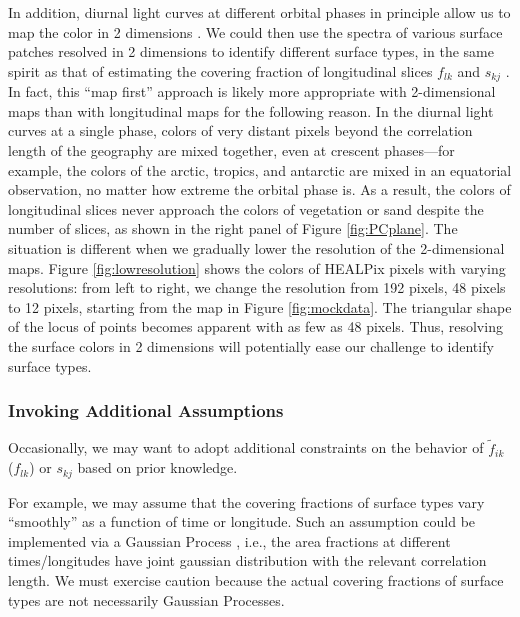\documentclass[iop,numberedappendix,apj]{emulateapj}
\def\fast{\tilde f}
\begin{document}
In addition, diurnal light curves at different orbital phases in principle allow us to map the color in 2 dimensions \citep{Kawahara2010,Kawahara2011,Fujii2012}. 
We could then use the spectra of various surface patches resolved in 2 dimensions to identify different surface types, in the same spirit as that of estimating the covering fraction of longitudinal slices $f_{lk}$ and $s_{kj}$ . 
In fact, this ``map first'' approach is likely more appropriate with 2-dimensional maps than with longitudinal maps for the following reason. 
In the diurnal light curves at a single phase, colors of very distant pixels beyond the correlation length of the geography are mixed together, even at crescent phases---for example, the colors of the arctic, tropics, and antarctic are mixed in an equatorial observation, no matter how extreme the orbital phase is. 
As a result, the colors of longitudinal slices never approach the colors of vegetation or sand despite the number of slices, as shown in the right panel of Figure \ref{fig:PCplane}. 
The situation is different when we gradually lower the resolution of the 2-dimensional maps. 
Figure \ref{fig:lowresolution} shows the colors of HEALPix pixels \citep{Gorski2005} with varying resolutions: from left to right, we change the resolution from 192 pixels, 48 pixels to 12 pixels, starting from the map in Figure \ref{fig:mockdata}. 
The triangular shape of the locus of points becomes apparent with as few as 48 pixels. 
Thus, resolving the surface colors in 2 dimensions will potentially ease our challenge to identify surface types. 



\subsubsection{Invoking Additional Assumptions}

Occasionally, we may want to adopt additional constraints on the behavior of $\fast _{ik}$ ($f_{lk}$) or $s_{kj}$ based on prior knowledge. 

For example, we may assume that the covering fractions of surface types vary  ``smoothly'' as a function of time or longitude. 
Such an assumption could be implemented via a Gaussian Process \citep[e.g.,][]{Rasmussen2005}, i.e., the area fractions at different times/longitudes have joint gaussian distribution with the relevant correlation length. 
We must exercise caution because the actual covering fractions of surface types are not necessarily Gaussian Processes. 
\end{document}
